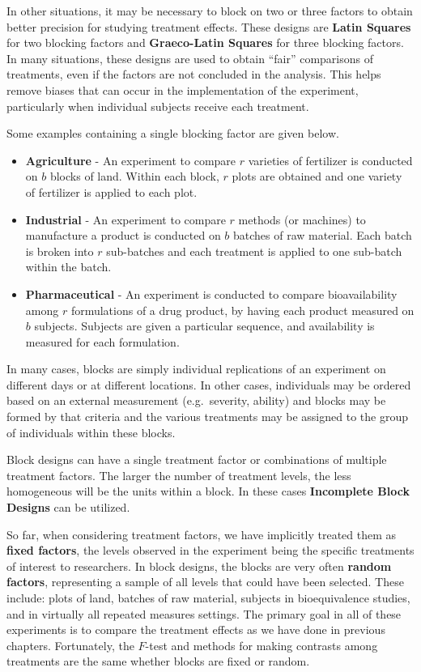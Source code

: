 \documentclass[
]{book}
\providecommand{\tightlist}{%
  \setlength{\itemsep}{0pt}\setlength{\parskip}{0pt}}
\begin{document}
In other situations, it may be necessary to block on two or three
factors to obtain better precision for studying treatment effects. These
designs are \textbf{Latin Squares} for two blocking factors and
\textbf{Graeco-Latin Squares} for three blocking factors. In many
situations, these designs are used to obtain ``fair'' comparisons of
treatments, even if the factors are not concluded in the analysis. This
helps remove biases that can occur in the implementation of the
experiment, particularly when individual subjects receive each
treatment.

Some examples containing a single blocking factor are given below.

\begin{itemize}
\tightlist
\item
  \textbf{Agriculture} - An experiment to compare \(r\) varieties of
  fertilizer is conducted on \(b\) blocks of land. Within each block,
  \(r\) plots are obtained and one variety of fertilizer is applied to
  each plot.
\item
  \textbf{Industrial} - An experiment to compare \(r\) methods (or
  machines) to manufacture a product is conducted on \(b\) batches of
  raw material. Each batch is broken into \(r\) sub-batches and each
  treatment is applied to one sub-batch within the batch.
\item
  \textbf{Pharmaceutical} - An experiment is conducted to compare
  bioavailability among \(r\) formulations of a drug product, by having
  each product measured on \(b\) subjects. Subjects are given a
  particular sequence, and availability is measured for each
  formulation.
\end{itemize}

In many cases, blocks are simply individual replications of an
experiment on different days or at different locations. In other cases,
individuals may be ordered based on an external measurement
(e.g.~severity, ability) and blocks may be formed by that criteria and
the various treatments may be assigned to the group of individuals
within these blocks.

Block designs can have a single treatment factor or combinations of
multiple treatment factors. The larger the number of treatment levels,
the less homogeneous will be the units within a block. In these cases
\textbf{Incomplete Block Designs} can be utilized.

So far, when considering treatment factors, we have implicitly treated
them as \textbf{fixed factors}, the levels observed in the experiment
being the specific treatments of interest to researchers. In block
designs, the blocks are very often \textbf{random factors}, representing
a sample of all levels that could have been selected. These include:
plots of land, batches of raw material, subjects in bioequivalence
studies, and in virtually all repeated measures settings. The primary
goal in all of these experiments is to compare the treatment effects as
we have done in previous chapters. Fortunately, the \(F\)-test and
methods for making contrasts among treatments are the same whether
blocks are fixed or random.
\end{document}
